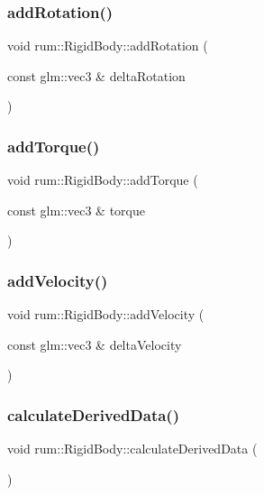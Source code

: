 \subsubsection{\texorpdfstring{add\+Rotation()}{addRotation()}}
{\footnotesize\ttfamily void rum\+::\+Rigid\+Body\+::add\+Rotation (\begin{DoxyParamCaption}\item[{const glm\+::vec3 \&}]{delta\+Rotation }\end{DoxyParamCaption})}

\mbox{\label{classrum_1_1_rigid_body_aaaf225465b2beb2e1d5737adb17a1421}} 
\subsubsection{\texorpdfstring{add\+Torque()}{addTorque()}}
{\footnotesize\ttfamily void rum\+::\+Rigid\+Body\+::add\+Torque (\begin{DoxyParamCaption}\item[{const glm\+::vec3 \&}]{torque }\end{DoxyParamCaption})}

\mbox{\label{classrum_1_1_rigid_body_a347acf72fd3aa739218025050713948a}} 
\subsubsection{\texorpdfstring{add\+Velocity()}{addVelocity()}}
{\footnotesize\ttfamily void rum\+::\+Rigid\+Body\+::add\+Velocity (\begin{DoxyParamCaption}\item[{const glm\+::vec3 \&}]{delta\+Velocity }\end{DoxyParamCaption})}

\mbox{\label{classrum_1_1_rigid_body_a3f14dfc9bb7dcfc961373b8f7cb71dc9}} 
\subsubsection{\texorpdfstring{calculate\+Derived\+Data()}{calculateDerivedData()}}
{\footnotesize\ttfamily void rum\+::\+Rigid\+Body\+::calculate\+Derived\+Data (\begin{DoxyParamCaption}{ }\end{DoxyParamCaption})}

